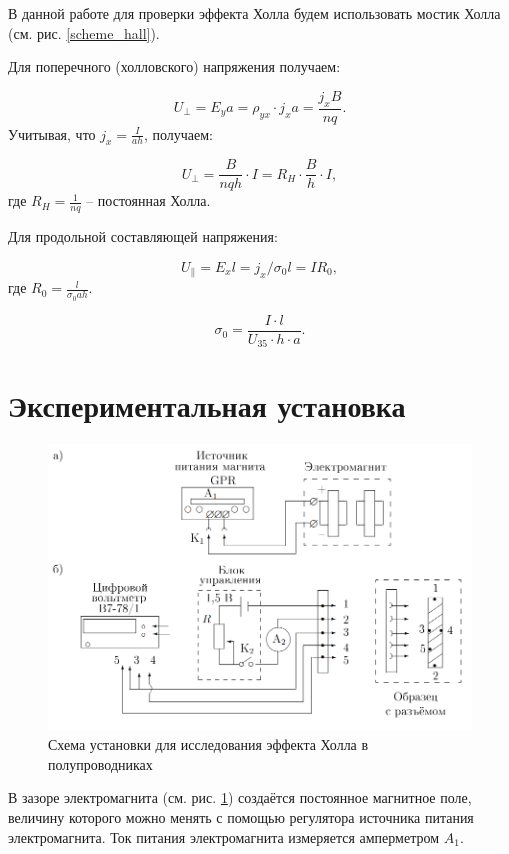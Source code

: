 \documentclass[12pt,a4paper]{article}
\newcommand{\figref}[1]{(см. рис. \ref{#1})}
\begin{document}
	В данной работе для проверки эффекта Холла будем использовать мостик Холла \figref{scheme_hall}.
	
	Для поперечного (холловского) напряжения получаем:
	
	$$ U_\perp = E_y a = \rho_{yx} \cdot j_x a= \frac{j_x B}{n q}. $$
	Учитывая, что $j_x = \frac{I}{ah}$, получаем:
	
	\begin{equation}
		\label{U_perp}
		U_\perp = \frac{B}{nqh} \cdot I = R_H \cdot \frac{B}{h} \cdot I,
	\end{equation}
	где $R_H = \frac{1}{nq}$ -- постоянная Холла.
	
	Для продольной составляющей напряжения:
	
	$$ U_\parallel = E_x l = j_x / \sigma_0 l = I R_0, $$
	где $R_0 = \frac{l}{\sigma_0 a h}$.
	
	\begin{equation}
		\label{sigma_0}
		\sigma_0 = \frac{I \cdot l}{U_{35} \cdot h \cdot a}.
	\end{equation}
	
	
	\section*{Экспериментальная установка}
	
	\begin{figure}[h]
		\includegraphics[scale=0.65]{res/scheme.png}
		\caption{Схема установки для исследования эффекта Холла в полупроводниках}
		\label{scheme}
	\end{figure}
	
	В зазоре электромагнита \figref{scheme} создаётся постоянное магнитное поле, величину которого можно менять с помощью регуля­тора источника питания электромагнита. Ток питания электромагни­та измеряется амперметром $A_1$.
	
\end{document}
